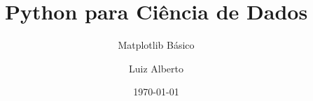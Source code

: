 \documentclass[t, final, 12pt, xcolor={usenames,dvipsnames}, table]{beamer}
\author{Luiz Alberto}
\title{Python para Ciência de Dados}
\subtitle{Matplotlib Básico}
\institute{Ciência da Computação}
\date{\today}
\begin{document}
  
  \begin{frame}[t,plain]
    \titlepage
  \end{frame}
  
  
  
  
  
  
  
  
  
\end{document}
